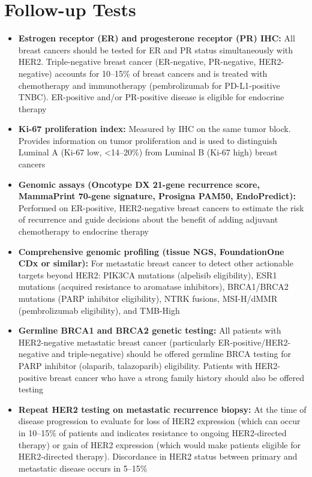 \section*{Follow-up Tests}
\begin{itemize}
  \item \textbf{Estrogen receptor (ER) and progesterone receptor (PR) IHC:} All breast cancers should be tested for ER and PR status simultaneously with HER2. Triple-negative breast cancer (ER-negative, PR-negative, HER2-negative) accounts for 10--15\% of breast cancers and is treated with chemotherapy and immunotherapy (pembrolizumab for PD-L1-positive TNBC). ER-positive and/or PR-positive disease is eligible for endocrine therapy
  \item \textbf{Ki-67 proliferation index:} Measured by IHC on the same tumor block. Provides information on tumor proliferation and is used to distinguish Luminal A (Ki-67 low, <14--20\%) from Luminal B (Ki-67 high) breast cancers
  \item \textbf{Genomic assays (Oncotype DX 21-gene recurrence score, MammaPrint 70-gene signature, Prosigna PAM50, EndoPredict):} Performed on ER-positive, HER2-negative breast cancers to estimate the risk of recurrence and guide decisions about the benefit of adding adjuvant chemotherapy to endocrine therapy
  \item \textbf{Comprehensive genomic profiling (tissue NGS, FoundationOne CDx or similar):} For metastatic breast cancer to detect other actionable targets beyond HER2: PIK3CA mutations (alpelisib eligibility), ESR1 mutations (acquired resistance to aromatase inhibitors), BRCA1/BRCA2 mutations (PARP inhibitor eligibility), NTRK fusions, MSI-H/dMMR (pembrolizumab eligibility), and TMB-High
  \item \textbf{Germline BRCA1 and BRCA2 genetic testing:} All patients with HER2-negative metastatic breast cancer (particularly ER-positive/HER2-negative and triple-negative) should be offered germline BRCA testing for PARP inhibitor (olaparib, talazoparib) eligibility. Patients with HER2-positive breast cancer who have a strong family history should also be offered testing
  \item \textbf{Repeat HER2 testing on metastatic recurrence biopsy:} At the time of disease progression to evaluate for loss of HER2 expression (which can occur in 10--15\% of patients and indicates resistance to ongoing HER2-directed therapy) or gain of HER2 expression (which would make patients eligible for HER2-directed therapy). Discordance in HER2 status between primary and metastatic disease occurs in 5--15\%

\end{itemize}
